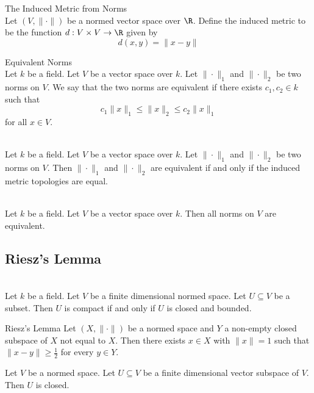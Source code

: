 \documentclass[a4paper]{article}
\begin{document}
\begin{defn}{The Induced Metric from Norms}{}\\
Let $(V,\|\cdot\|)$ be a normed vector space over $\R$. Define the induced metric to be the function $d:V\times V\to\R$ given by $$d(x,y)=\|x-y\|$$
\end{defn}

\begin{defn}{Equivalent Norms}{}\\
Let $k$ be a field. Let $V$ be a vector space over $k$. Let $\|\cdot\|_1$ and $\|\cdot\|_2$ be two norms on $V$. We say that the two norms are equivalent if there exists $c_1,c_2\in k$ such that $$c_1\|x\|_1\leq\|x\|_2\leq c_2\|x\|_1$$ for all $x\in V$. 
\end{defn}

\begin{prp}{}{}\\
Let $k$ be a field. Let $V$ be a vector space over $k$. Let $\|\cdot\|_1$ and $\|\cdot\|_2$ be two norms on $V$. Then $\|\cdot\|_1$ and $\|\cdot\|_2$ are equivalent if and only if the induced metric topologies are equal. 
\end{prp}

\begin{prp}{}{}\\
Let $k$ be a field. Let $V$ be a vector space over $k$. Then all norms on $V$ are equivalent. 
\end{prp}

\subsection{Riesz's Lemma}
\begin{prp}{}{}\\
Let $k$ be a field. Let $V$ be a finite dimensional normed space. Let $U\subseteq V$ be a subset. Then $U$ is compact if and only if $U$ is closed and bounded. 
\end{prp}

\begin{lmm}{Riesz's Lemma}{} Let $(X,\|\cdot\|)$ be a normed space and $Y$ a non-empty closed subspace of $X$ not equal to $X$. Then there exists $x\in X$ with $\|x\|=1$ such that $\|x-y\|\geq \frac{1}{2}$ for every $y\in Y$. 
\end{lmm}

\begin{prp}{}{} Let $V$ be a normed space. Let $U\subseteq V$ be a finite dimensional vector subspace of $V$. Then $U$ is closed. 
\end{prp}
\end{document}
